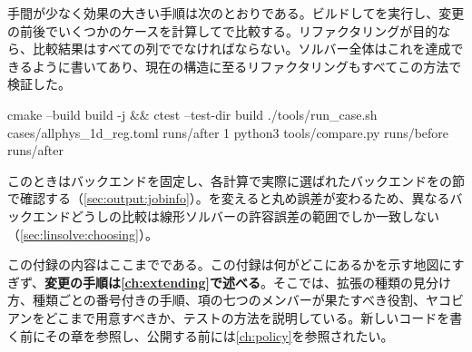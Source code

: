 手間が少なく効果の大きい手順は次のとおりである。ビルドしてを実行し、変更の前後でいくつかのケースを計算してで比較する。リファクタリングが目的なら、比較結果はすべての列ででなければならない。ソルバー全体はこれを達成できるように書いてあり、現在の構造に至るリファクタリングもすべてこの方法で検証した。

\begin{shell}
cmake --build build -j && ctest --test-dir build
./tools/run_case.sh cases/allphys_1d_reg.toml runs/after 1
python3 tools/compare.py runs/before runs/after
\end{shell}

このときはバックエンドを固定し、各計算で実際に選ばれたバックエンドをの節で確認する（\cref{sec:output:jobinfo}）。を変えると丸め誤差が変わるため、異なるバックエンドどうしの比較は線形ソルバーの許容誤差の範囲でしか一致しない（\cref{sec:linsolve:choosing}）。

この付録の内容はここまでである。この付録は何がどこにあるかを示す地図にすぎず、\textbf{変更の手順は\cref{ch:extending}で述べる}。そこでは、拡張の種類の見分け方、種類ごとの番号付きの手順、項の七つのメンバーが果たすべき役割、ヤコビアンをどこまで用意すべきか、テストの方法を説明している。新しいコードを書く前にその章を参照し、公開する前には\cref{ch:policy}を参照されたい。
